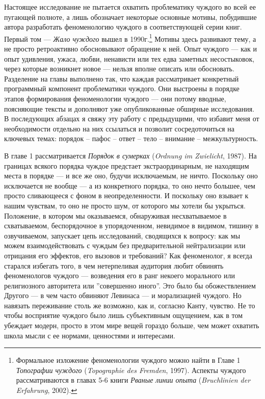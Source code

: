 \documentclass[12pt]{book}
\begin{document}
Настоящее исследование не пытается охватить проблематику чуждого во всей ее пугающей полноте, а лишь обозначает некоторые основные мотивы, побудившие автора разработать феноменологию чуждого в соответствующей серии книг. Первый том --- \textit{Жало чуждого} вышел в 1990г.\footnote{Формальное изложение феноменологии чуждого можно найти в Главе 1 \textit{Топографии чуждого} (\textit{Topographie des Fremden}, 1997). Аспекты чуждого рассматриваются в главах 5-6 книги \textit{Рваные линии опыта} (\textit{Bruchlinien der Erfahrung}, 2002).} Мотивы здесь развивают тему, а не просто ретроактивно обосновывают обращение к ней. Опыт чуждого --- как и опыт удивления, ужаса, любви, ненависти или тех едва заметных несостыковок, через которые возникнет новое --- нельзя вполне описать или обосновать. Разделение на главы выполнено так, что каждая рассматривает конкретный программный компонент проблематики чуждого. Они выстроены в порядке этапов формирования феноменологии чуждого --- они потому вводные, поясняющие тексты и дополняют уже опубликованные обширные исследования. В последующих абзацах я свяжу эту работу с предыдущими, что избавит меня от необходимости отдельно на них ссылаться и позволит сосредоточиться на ключевых темах: порядок -- пафос -- ответ -- тело -- внимание -- межкультурность.

В главе 1 рассматривается \textit{Порядок в сумерках} (\textit{Ordnung im Zwielicht}, 1987). На границах всякого порядка чуждое предстает экстраординарным, не находящим места в порядке --- и все же оно, будучи исключаемым, не ничто. Поскольку оно исключается не вообще --- а из конкретного порядка, то оно нечто большее, чем просто сливающееся с фоном в неопределенности. И поскольку оно взывает к нашим чувствам, то оно не просто шум, от которого мы хотели бы укрыться. Положение, в котором мы оказываемся, обнаруживая несхватываемое в схватываемом, беспорядочное в упорядоченном, невидимое в видимом, тишину в озвучиваемом, запускает цепь исследований, сводящихся к вопросу: как мы можем взаимодействовать с чуждым без предварительной нейтрализации или отрицания его эффектов, его вызовов и требований? Как феноменолог, я всегда старался избегать того, в чем нетерпеливая аудитория любит обвинять феноменологов чуждого --- возведения его в ранг некоего морального или религиозного авторитета или ''совершенно иного''. Это было бы обожествлением Другого --- в чем часто обвиняют Левинаса --- и морализацией чуждого. Но навязать переживание столь же возможно, как и, согласно Канту, чувство. Не то чтобы восприятие чуждого было лишь субъективным ощущением, как в том убеждает модерн, просто в этом мире вещей гораздо больше, чем может охватить школа мысли с ее нормами, ценностями и интересами.
\end{document}
